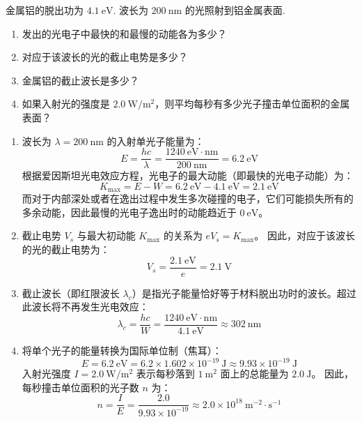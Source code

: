 \begin{exercise}\label{ex:22.5}
金属铝的脱出功为 $4.1 \ \mathrm{eV}$. 波长为 $200 \ \mathrm{nm}$ 的光照射到铝金属表面. 
\begin{enumerate}
  \item[(a)] 发出的光电子中最快的和最慢的动能各为多少？
  \item[(b)] 对应于该波长的光的截止电势是多少？
  \item[(c)] 金属铝的截止波长是多少？
  \item[(d)] 如果入射光的强度是 $2.0 \ \mathrm{W/m^2}$，则平均每秒有多少光子撞击单位面积的金属表面？
\end{enumerate}
\end{exercise}
\begin{solution}
\begin{enumerate}
    \item[(a)] 波长为 $\lambda = 200 \ \mathrm{nm}$ 的入射单光子能量为：
    $$ E = \frac{hc}{\lambda} = \frac{1240 \ \mathrm{eV \cdot nm}}{200 \ \mathrm{nm}} = 6.2 \ \mathrm{eV} $$
    根据爱因斯坦光电效应方程，光电子的最大动能（即最快的光电子动能）为：
    $$ K_{\max} = E - W = 6.2 \ \mathrm{eV} - 4.1 \ \mathrm{eV} = 2.1 \ \mathrm{eV} $$
    而对于内部深处或者在逸出过程中发生多次碰撞的电子，它们可能损失所有的多余动能，因此最慢的光电子逸出时的动能趋近于 $0 \ \mathrm{eV}$。
    
    \item[(b)] 截止电势 $V_s$ 与最大初动能 $K_{\max}$ 的关系为 $e V_s = K_{\max}$。
    因此，对应于该波长的光的截止电势为：
    $$ V_s = \frac{2.1 \ \mathrm{eV}}{e} = 2.1 \ \mathrm{V} $$
    
    \item[(c)] 截止波长（即红限波长 $\lambda_c$）是指光子能量恰好等于材料脱出功时的波长。超过此波长将不再发生光电效应：
    $$ \lambda_c = \frac{hc}{W} = \frac{1240 \ \mathrm{eV \cdot nm}}{4.1 \ \mathrm{eV}} \approx 302 \ \mathrm{nm} $$
    
    \item[(d)] 将单个光子的能量转换为国际单位制（焦耳）：
    $$ E = 6.2 \ \mathrm{eV} = 6.2 \times 1.602 \times 10^{-19} \ \mathrm{J} \approx 9.93 \times 10^{-19} \ \mathrm{J} $$
    入射光强度 $I = 2.0 \ \mathrm{W/m^2}$ 表示每秒落到 $1 \ \mathrm{m^2}$ 面上的总能量为 $2.0 \ \mathrm{J}$。
    因此，每秒撞击单位面积的光子数 $n$ 为：
    $$ n = \frac{I}{E} = \frac{2.0}{9.93 \times 10^{-19}} \approx 2.0 \times 10^{18} \ \mathrm{m^{-2} \cdot s^{-1}} $$
\end{enumerate}
\end{solution}

